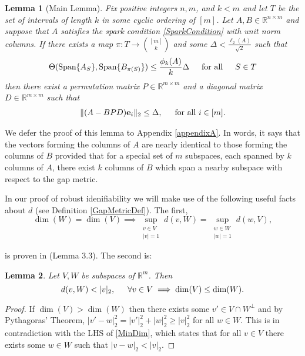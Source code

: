 \documentclass[journal, onecolumn]{IEEEtran}
\newtheorem{lemma}{Lemma}
\begin{document}
\begin{lemma}[Main Lemma]\label{MainLemma}
Fix positive integers $n, m$, and $k < m$ and let $T$ be the set of intervals of length $k$ in some cyclic ordering of $[m]$. Let $A, B \in \mathbb{R}^{n \times m}$ and suppose that $A$ satisfies the spark condition \eqref{SparkCondition} with unit norm columns.  If there exists a map $\pi: T \to {[m] \choose k}$ and some $\Delta < \frac{\ell_{2}(A)}{\sqrt{2}}$ such that 
\begin{equation}\label{GapUpperBound}
\Theta(\text{Span}\{A_{S}\}, \text{Span}\{B_{\pi(S)}\}) \leq \frac{ \phi_k(A) }{k} \Delta \indent \text{for all} \indent S \in T
\end{equation}
%
then there exist a permutation matrix $P \in \mathbb{R}^{m \times m}$ and a diagonal matrix $D \in \mathbb{R}^{m \times m}$ such that
\begin{align}
\|(A - BPD)\mathbf{e}_i\|_2 \leq \Delta, \indent \text{for all } i \in [m].
\end{align}
\end{lemma}
We defer the proof of this lemma to Appendix \ref{appendixA}. In words, it says that the vectors forming the columns of $A$ are nearly identical to those forming the columns of $B$ provided that for a special set of $m$ subspaces, each spanned by $k$ columns of $A$, there exist $k$ columns of $B$ which span a nearby subspace with respect to the gap metric.

In our proof of robust idenifiability we will make use of the following useful facts about $d$ (see Definition \ref{GapMetricDef}). The first, 
\begin{equation}\label{SubspaceMetricSameDim}
\dim(W) = \dim(V) \implies \sup_{\substack{v \in V \\ |v| = 1}}  d(v,W)  = \sup_{\substack{w \in W \\ |w| = 1}} d(w,V),
\end{equation}

is proven in \cite{Morris10} (Lemma 3.3). The second is:
\begin{lemma}\label{MinDimLemma}
Let $V, W$ be subspaces of $\mathbb{R}^{m}$. Then
\begin{equation}\label{MinDim}
d(v,W) < |v|_2, \indent \forall v \in V \implies \dim(V) \leq \dim(W).
\end{equation}
\end{lemma}

\begin{proof}
If $\dim(V) > \dim(W)$ then there exists some $v' \in V \cap W^\perp$ and by Pythagoras' Theorem, $|v' - w|_2^2 = |v'|_2^2 + |w|_2^2 \geq |v|_2^2$ for all $w \in W$. This is in contradiction with the LHS of \eqref{MinDim}, which states that for all $v \in V$ there exists some $w \in W$ such that $|v - w|_2 < |v|_2$.
\end{proof}
\end{document}
